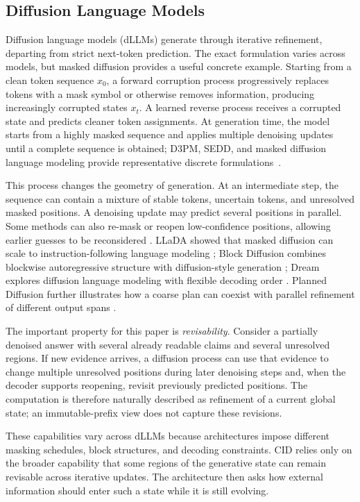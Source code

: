 \subsection{Diffusion Language Models}

Diffusion language models (dLLMs) generate through iterative refinement, departing from strict next-token prediction. The exact formulation varies across models, but masked diffusion provides a useful concrete example. Starting from a clean token sequence $x_0$, a forward corruption process progressively replaces tokens with a mask symbol or otherwise removes information, producing increasingly corrupted states $x_t$. A learned reverse process receives a corrupted state and predicts cleaner token assignments. At generation time, the model starts from a highly masked sequence and applies multiple denoising updates until a complete sequence is obtained; D3PM, SEDD, and masked diffusion language modeling provide representative discrete formulations~\citep{austin2021d3pm,lou2024sedd,sahoo2024mdlm}.

This process changes the geometry of generation. At an intermediate step, the sequence can contain a mixture of stable tokens, uncertain tokens, and unresolved masked positions. A denoising update may predict several positions in parallel. Some methods can also re-mask or reopen low-confidence positions, allowing earlier guesses to be reconsidered \citep{huang2025remedi}. LLaDA showed that masked diffusion can scale to instruction-following language modeling \citep{nie2025llada}; Block Diffusion combines blockwise autoregressive structure with diffusion-style generation \citep{arriola2025blockdiffusion}; Dream explores diffusion language modeling with flexible decoding order \citep{ye2025dream}. Planned Diffusion further illustrates how a coarse plan can coexist with parallel refinement of different output spans \citep{israel2025planned}.

The important property for this paper is \emph{revisability}. Consider a partially denoised answer with several already readable claims and several unresolved regions. If new evidence arrives, a diffusion process can use that evidence to change multiple unresolved positions during later denoising steps and, when the decoder supports reopening, revisit previously predicted positions. The computation is therefore naturally described as refinement of a current global state; an immutable-prefix view does not capture these revisions.

These capabilities vary across dLLMs because architectures impose different masking schedules, block structures, and decoding constraints. CID relies only on the broader capability that some regions of the generative state can remain revisable across iterative updates. The architecture then asks how external information should enter such a state while it is still evolving.

